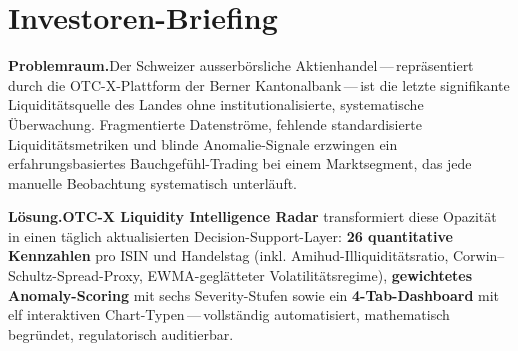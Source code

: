 \documentclass[11pt, a4paper, oneside, openany]{report}
\newcommand{\term}[1]{\textcolor{SwissRed}{\sffamily\textbf{#1}}}
\begin{document}

\chapter*{Investoren-Briefing}

\vspace{-0.4cm}
\noindent{\small\sffamily\textcolor{SlateGrey}{Kompaktes Lagebild für Entscheidungsträger\;\textbullet\;Stand: Mai 2026}}

\vspace{0.8cm}


\noindent\textbf{\sffamily\textcolor{SwissRed}{Problemraum.}}\;Der Schweizer ausserbörsliche Aktienhandel\,---\,repräsentiert durch die OTC-X-Plattform der Berner Kantonalbank\,---\,ist die letzte signifikante Liquiditätsquelle des Landes ohne institutionalisierte, systematische Überwachung. Fragmentierte Datenströme, fehlende standardisierte Liquiditätsmetriken und blinde Anomalie-Signale erzwingen ein erfahrungsbasiertes \glqq Bauchgefühl-Trading\grqq{} bei einem Marktsegment, das jede manuelle Beobachtung systematisch unterläuft.

\vspace{0.35cm}

\noindent\textbf{\sffamily\textcolor{SwissRed}{Lösung.}}\;\term{OTC-X Liquidity Intelligence Radar} transformiert diese Opazität in einen täglich aktualisierten Decision-Support-Layer: \textbf{26 quantitative Kennzahlen} pro ISIN und Handelstag (inkl. Amihud-Illiquiditätsratio, Corwin--Schultz-Spread-Proxy, EWMA-geglätteter Volatilitätsregime), \textbf{gewichtetes Anomaly-Scoring} mit sechs Severity-Stufen sowie ein \textbf{4-Tab-Dashboard} mit elf interaktiven Chart-Typen\,---\,vollständig automatisiert, mathematisch begründet, regulatorisch auditierbar.

\vspace{0.35cm}
\end{document}

